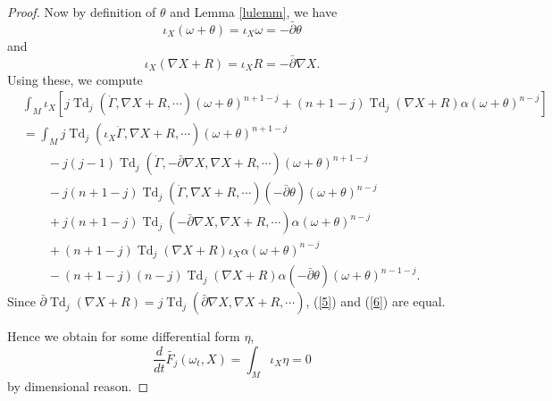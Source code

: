 \documentclass[12pt,reqno,a4paper]{amsart}
\numberwithin{equation}{section}
\def\bp{\bar\partial}
\def\a{\alpha}
\DeclareMathOperator{\Td}{Td}
\theoremstyle{remark}
\theoremstyle{dotless}
\begin{document}
\begin{proof}
Now by definition of $\theta$ and Lemma \ref{lulemm}, we have
\begin{equation}\label{lem1}
\iota_X (\omega+\theta)=\iota_X \omega = -\bp\theta
\end{equation}
and
\begin{equation}\label{lem2}
\iota_X (\nabla X+ R)=\iota_X R = -\bp\nabla X.
\end{equation}
Using these, we compute
\begin{align}\label{6}
&\int_M \iota_X \left[j\Td_j(\dot{\Gamma},\nabla X+R,\cdots)(\omega+\theta)^{n+1-j}+(n+1-j)\Td_j(\nabla X+R)\a(\omega+\theta)^{n-j} \right]\nonumber\\
&=\int_M j\Td_j(\iota_X \dot{\Gamma},\nabla X+R,\cdots)(\omega+\theta)^{n+1-j}\nonumber\\
&\qquad-j(j-1)\Td_j(\dot{\Gamma},-\bp\nabla X,\nabla X+R,\cdots)(\omega+\theta)^{n+1-j}\nonumber\\
&\qquad -j(n+1-j)\Td_j (\dot{\Gamma},\nabla X+R,\cdots)(-\bp\theta)(\omega+\theta)^{n-j} \nonumber\\
&\qquad +j(n+1-j)\Td_j (-\bp\nabla X,\nabla X+R,\cdots)\a(\omega+\theta)^{n-j} \nonumber\\
&\qquad +(n+1-j) \Td_j (\nabla X+R) \iota_X \a (\omega+\theta)^{n-j} \nonumber\\
&\qquad -(n+1-j)(n-j)\Td_j (\nabla X+R) \a (-\bp\theta)(\omega+\theta)^{n-1-j}.
\end{align}
Since $\bp \Td_j(\nabla X + R)=j\Td_j(\bp\nabla X,\nabla X + R,\cdots)$, (\ref{5}) and (\ref{6}) are equal.

Hence we obtain for some differential form $\eta$,
\begin{equation*}
\frac{d}{dt}\widetilde{F_j}(\omega_t,X)=\int_M \iota_X \eta =0
\end{equation*}
by dimensional reason.


\end{proof}
\end{document}
